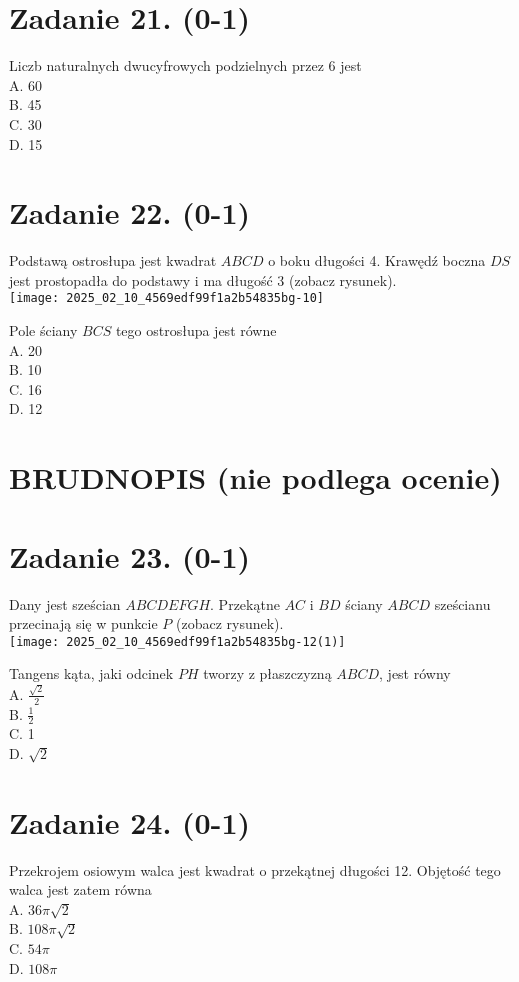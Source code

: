 \documentclass[10pt]{article}
\begin{document}
\section*{Zadanie 21. (0-1)}
Liczb naturalnych dwucyfrowych podzielnych przez 6 jest\\
A. 60\\
B. 45\\
C. 30\\
D. 15

\section*{Zadanie 22. (0-1)}
Podstawą ostrosłupa jest kwadrat \(A B C D\) o boku długości 4. Krawędź boczna \(D S\) jest prostopadła do podstawy i ma długość 3 (zobacz rysunek).\\
\texttt{[image: 2025\_02\_10\_4569edf99f1a2b54835bg-10]}

Pole ściany \(B C S\) tego ostrosłupa jest równe\\
A. 20\\
B. 10\\
C. 16\\
D. 12

\section*{BRUDNOPIS (nie podlega ocenie)}
\section*{Zadanie 23. (0-1)}
Dany jest sześcian \(A B C D E F G H\). Przekątne \(A C\) i \(B D\) ściany \(A B C D\) sześcianu przecinają się w punkcie \(P\) (zobacz rysunek).\\
\texttt{[image: 2025\_02\_10\_4569edf99f1a2b54835bg-12(1)]}

Tangens kąta, jaki odcinek \(P H\) tworzy z płaszczyzną \(A B C D\), jest równy\\
A. \(\frac{\sqrt{2}}{2}\)\\
B. \(\frac{1}{2}\)\\
C. 1\\
D. \(\sqrt{2}\)

\section*{Zadanie 24. (0-1)}
Przekrojem osiowym walca jest kwadrat o przekątnej długości 12. Objętość tego walca jest zatem równa\\
A. \(36 \pi \sqrt{2}\)\\
B. \(108 \pi \sqrt{2}\)\\
C. \(54 \pi\)\\
D. \(108 \pi\)
\end{document}
